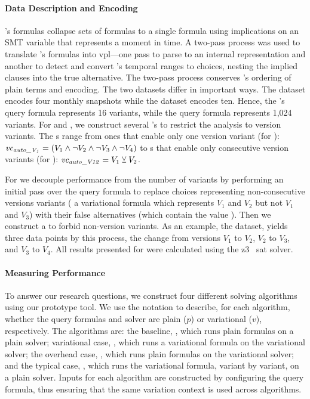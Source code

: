 \paragraph{Data Description and Encoding}%
\label{sec:exper:description}
%
\nieke{}'s formulas collapse sets of \pl{} formulas to a single formula using
implications on an SMT variable that represents a moment in time. A two-pass
process was used to translate \nieke{}'s formulas into \ac{vpl}---one pass to
parse to an internal representation and another to detect and convert \nieke{}'s
temporal ranges to choices, nesting the implied clauses into the true
alternative. The two-pass process conserves \nieke{}'s ordering of plain terms
and encoding. The two datasets differ in important ways. The \auto{} dataset
encodes four monthly snapshots while the \fin{} dataset encodes ten. Hence, the
\auto{}'s query formula represents 16 variants, while the \fin{} query formula
represents 1,024 variants. For  and , we construct several
\vc{}'s to restrict the analysis to version variants. The \vc{}s range from ones
that enable only one version variant (for ): $\mathit{vc_{\mathit{auto\_V_{1}}}}
= (V_{1} \wedge \neg V_{2} \wedge \neg V_{3} \wedge \neg V_{4})$ to \vc{}s that
enable only consecutive version variants (for ):
$\mathit{vc_{\mathit{auto\_V12}}} = V_{1} \veebar V_{2}$.

For  we decouple performance from the number of variants by performing
an initial pass over the query formula to replace choices representing
non-consecutive versions variants (\eg{} a variational formula which represents
$V_{1}$ and $V_{2}$ but not $V_{1}$ and $V_{3}$) with their false alternatives
(which contain the value \tru{}). Then we construct a \vc{} to forbid
non-version variants. As an example, the \auto{} dataset, yields three data
points by this process, the change from versions $V_{1}$ to $V_{2}$, $V_{2}$ to
$V_{3}$, and $V_{3}$ to $V_{4}$. All results presented for  were
  calculated using the z3~{\citep{10.1007/978-3-540-78800-3_24}} \ac{sat}
  solver.

\paragraph{Measuring Performance}%
\label{sec:exper:perf}
%
To answer our research questions, we construct four different solving
algorithms using our prototype tool. We use the notation
 to describe, for each algorithm, whether the query
formulas and solver are plain ($p$) or variational ($v$), respectively.
%
The algorithms are: the baseline, \pTop{}, which runs plain formulas on a plain
solver; variational case, \vTov{}, which runs a variational formula on the
variational solver; the overhead case, \pTov{}, which runs plain formulas on the
variational solver; and the typical case, \vTop{}, which runs the variational
formula, variant by variant, on a plain solver. Inputs for each algorithm are
constructed by configuring the query formula, thus ensuring that the same
variation context is used across algorithms.

